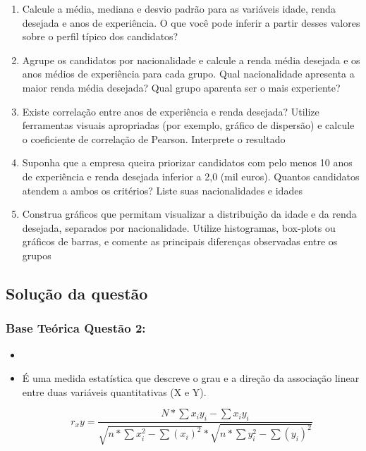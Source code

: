 \documentclass[a4paper,11pt]{article}
\begin{document}
\begin{enumerate}[leftmargin=*]
\item Calcule a média, mediana e desvio padrão para as variáveis idade, renda desejada e
anos de experiência. O que você pode inferir a partir desses valores sobre o perfil típico dos candidatos?

\item  Agrupe os candidatos por nacionalidade e calcule a renda média desejada e os anos
médios de experiência para cada grupo. Qual nacionalidade apresenta a maior renda
média desejada? Qual grupo aparenta ser o mais experiente?

\item Existe correlação entre anos de experiência e renda desejada? Utilize ferramentas visuais apropriadas (por exemplo, gráfico de dispersão) e calcule o coeficiente de correlação
de Pearson. Interprete o resultado

\item Suponha que a empresa queira priorizar candidatos com pelo menos 10 anos de experiência e renda desejada inferior a 2,0 (mil euros). Quantos candidatos atendem a ambos
os critérios? Liste suas nacionalidades e idades

\item Construa gráficos que permitam visualizar a distribuição da idade e da renda desejada,
separados por nacionalidade. Utilize histogramas, box-plots ou gráficos de barras, e
comente as principais diferenças observadas entre os grupos

\end{enumerate}

\subsection*{Solução da questão} 					

\subsubsection*{Base Teórica Questão 2:} 

\begin{itemize}
\item[]

    \item É uma medida estatística que descreve o grau e a direção da associação linear entre duas variáveis quantitativas (X e Y).

    \[r_xy = \frac{N*\sum{x_iy_i} - \sum{x_iy_i}}{\sqrt{n*\sum x_i^2 - \sum (x_i)^2} * \sqrt{n*\sum y_i^2 - \sum (y_i)^2}}\]

\end{itemize}
\end{document}

